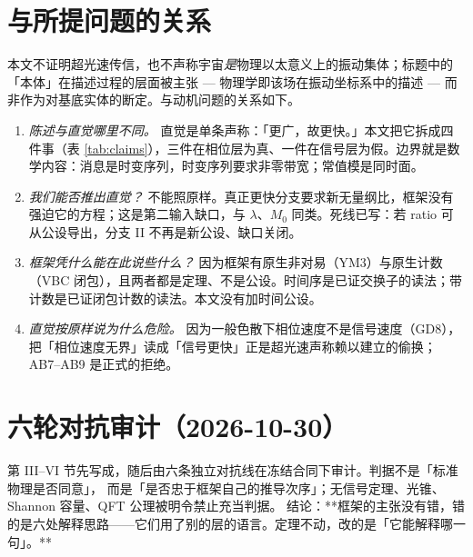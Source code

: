 \documentclass[aps,prd,preprint,superscriptaddress,amsmath,amssymb]{revtex4-2}
\begin{document}
\section{与所提问题的关系}
\label{sec:relation}

本文不证明超光速传信，也不声称宇宙\emph{是}物理以太意义上的振动集体；标题中的「本体」在描述过程的层面被主张 --- 物理学即该场在振动坐标系中的描述 --- 而非作为对基底实体的断定。与动机问题的关系如下。

\begin{enumerate}
\item \emph{陈述与直觉哪里不同。} 直觉是单条声称：「更广，故更快。」本文把它拆成四件事（表 \ref{tab:claims}），三件在相位层为真、一件在信号层为假。边界就是数学内容：消息是时变序列，时变序列要求非零带宽；常值模是同时面。
\item \emph{我们能否推出直觉？} 不能照原样。真正更快分支要求新无量纲比，框架没有强迫它的方程；这是第二输入缺口，与 $\lambda$、$M_0$ 同类。死线已写：若 ratio 可从公设导出，分支 II 不再是新公设、缺口关闭。
\item \emph{框架凭什么能在此说些什么？} 因为框架有原生非对易（YM3）与原生计数（VBC 闭包），且两者都是定理、不是公设。时间序是已证交换子的读法；带计数是已证闭包计数的读法。本文没有加时间公设。
\item \emph{直觉按原样说为什么危险。} 因为一般色散下相位速度不是信号速度（GD8），把「相位速度无界」读成「信号更快」正是超光速声称赖以建立的偷换；AB7--AB9 是正式的拒绝。
\end{enumerate}

\section{六轮对抗审计（2026-10-30）}
\label{sec:audit-zh}

第 III--VI 节先写成，随后由六条独立对抗线在冻结合同下审计。判据不是「标准物理是否同意」，
而是「是否忠于框架自己的推导次序」；无信号定理、光锥、Shannon 容量、QFT 公理被明令禁止充当判据。
结论：**框架的主张没有错，错的是六处解释思路——它们用了别的层的语言。定理不动，改的是「它能解释哪一句」。**
\end{document}

